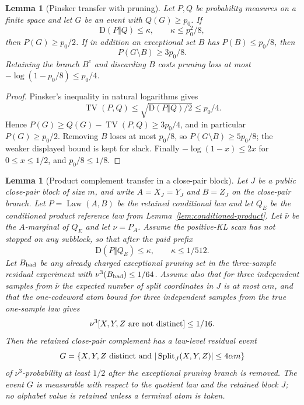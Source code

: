 \documentclass[11pt]{article}
\newtheorem{lemma}[theorem]{Lemma}
\theoremstyle{remark}
\newcommand{\KL}{\mathrm D}
\newcommand{\Split}{\operatorname{Split}}
\newcommand{\Law}{\operatorname{Law}}
\newcommand{\TV}{\operatorname{TV}}
\begin{document}
\begin{lemma}[Pinsker transfer with pruning]\label{lem:appendix-pinsker-transfer}
Let $P,Q$ be probability measures on a finite space and let $G$ be an event with $Q(G)\ge p_0$.  If
\[
        \KL(P\Vert Q)\le \kappa,
        \qquad \kappa\le p_0^2/8,
\]
then $P(G)\ge p_0/2$.  If in addition an exceptional set $B$ has $P(B)\le p_0/8$, then
\[
        P(G\setminus B)\ge 3p_0/8.
\]
Retaining the branch $B^c$ and discarding $B$ costs pruning loss at most $-\log(1-p_0/8)\le p_0/4$.
\end{lemma}

\begin{proof}
Pinsker's inequality in natural logarithms gives
\[
        \TV(P,Q)\le \sqrt{\KL(P\Vert Q)/2}\le p_0/4.
\]
Hence $P(G)\ge Q(G)-\TV(P,Q)\ge 3p_0/4$, and in particular $P(G)\ge p_0/2$.  Removing $B$ loses at most $p_0/8$, so $P(G\setminus B)\ge 5p_0/8$; the weaker displayed bound is kept for slack.  Finally $-\log(1-x)\le 2x$ for $0\le x\le 1/2$, and $p_0/8\le 1/8$.
\end{proof}

\begin{lemma}[Product complement transfer in a close-pair block]\label{lem:appendix-complement-transfer}
Let $J$ be a public close-pair block of size $m$, and write $A=X_J=Y_J$ and $B=Z_J$ on the close-pair branch.  Let $P=\Law(A,B)$ be the retained conditional law and let $Q_E$ be the conditioned product reference law from Lemma~\ref{lem:conditioned-product}.  Let $\bar\nu$ be the $A$-marginal of $Q_E$ and let $\nu=P_A$.  Assume the positive-KL scan has not stopped on any subblock, so that after the paid prefix
\[
        \KL(P\Vert Q_E)\le \kappa,
        \qquad \kappa\le 1/512.
\]
Let $B_{\rm bad}$ be any already charged exceptional pruning set in the three-sample residual experiment with $\nu^3(B_{\rm bad})\le1/64$.
Assume also that for three independent samples from $\bar\nu$ the expected number of split coordinates in $J$ is at most $\alpha m$, and that the one-codeword atom bound for three independent samples from the true one-sample law gives
\[
        \nu^3[X,Y,Z\hbox{ are not distinct}]\le 1/16.
\]
Then the retained close-pair complement has a law-level residual event
\[
        G=\{X,Y,Z\hbox{ distinct and } |\Split_J(X,Y,Z)|\le 4\alpha m\}
\]
of $\nu^3$-probability at least $1/2$ after the exceptional pruning branch is removed.  The event $G$ is measurable with respect to the quotient law and the retained block $J$; no alphabet value is retained unless a terminal atom is taken.
\end{lemma}
\end{document}

